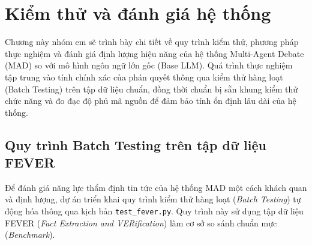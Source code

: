 \documentclass[12pt,a4paper]{report}
\begin{document}

\chapter{Kiểm thử và đánh giá hệ thống}
\label{ch:kiem_thu}

Chương này nhóm em sẽ trình bày chi tiết về quy trình kiểm thử, phương pháp thực nghiệm và đánh giá định lượng hiệu năng của hệ thống Multi-Agent Debate (MAD) so với mô hình ngôn ngữ lớn gốc (Base LLM). Quá trình thực nghiệm tập trung vào tính chính xác của phán quyết thông qua kiểm thử hàng loạt (Batch Testing) trên tập dữ liệu chuẩn, đồng thời chuẩn bị sẵn khung kiểm thử chức năng và đo đạc độ phủ mã nguồn để đảm bảo tính ổn định lâu dài của hệ thống.

\section{Quy trình Batch Testing trên tập dữ liệu FEVER}
\label{sec:batch_testing_fever}

Để đánh giá năng lực thẩm định tin tức của hệ thống MAD một cách khách quan và định lượng, dự án triển khai quy trình kiểm thử hàng loạt (\textit{Batch Testing}) tự động hóa thông qua kịch bản \texttt{test\_fever.py}. Quy trình này sử dụng tập dữ liệu FEVER (\textit{Fact Extraction and VERification}) làm cơ sở so sánh chuẩn mực (\textit{Benchmark}).
\end{document}

